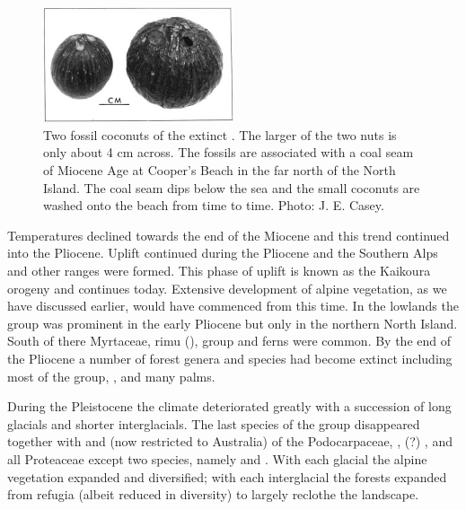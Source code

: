 \begin{figure}
	\includegraphics[width=0.5\textwidth]{graphics/figure124fossil-coconuts.jpg}
	\centering
	\caption[Two fossil coconuts]{Two fossil coconuts of the extinct .
    The larger of the two nuts is only about 4 cm across.
    The fossils are associated with a coal seam of Miocene Age at Cooper's Beach in the far north of the North Island.
    The coal seam dips below the sea and the small coconuts are washed onto the beach from time to time.
	Photo: J. E. Casey.}
	\label{fig:124fossil-coconuts}
\end{figure}

Temperatures declined towards the end of the Miocene and this trend continued into the Pliocene.
Uplift continued during the Pliocene and the Southern Alps and other ranges were formed.
This phase of uplift is known as the Kaikoura orogeny and continues today.
Extensive development of alpine vegetation, as we have discussed earlier, would have commenced from this time.
In the lowlands the  group was prominent in the early Pliocene but only in the northern North Island.
South of there Myrtaceae, rimu (),   group and ferns were common.
By the end of the Pliocene a number of forest genera and species had become extinct including most of the  group, ,  and many palms.

During the Pleistocene the climate deteriorated greatly with a succession of long glacials and shorter interglacials.
The last species of the  group disappeared together with  and  (now restricted to Australia) of the Podocarpaceae, , (?) ,  and all Proteaceae except two species, namely  and .
With each glacial the alpine vegetation expanded and diversified; with each interglacial the forests expanded from refugia (albeit reduced in diversity) to largely reclothe the landscape.

